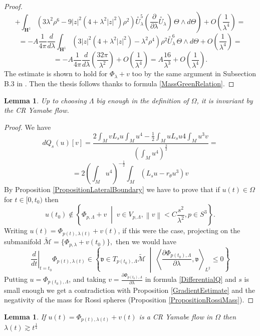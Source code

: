 \documentclass[a4paper,12pt]{amsart}
\newtheorem{lemma}[proposizione]{Lemma}
\newcommand{\de}{\partial}
\newcommand{\ci}[1]{\mathscr{#1}}%
\newcommand{\N}[1]{\left\lVert#1\right\rVert}
\newcommand{\bra}{\left\langle}
\newcommand{\ket}{\right\rangle}
\renewcommand{\H}{\mathbf{H}}
\newcommand{\g}[1]{\mathfrak{#1}}
\renewcommand{\l}{\lambda }
\begin{document}
\begin{proof}
 $$\left.+ \int_{\H^1}\left(3\lambda^2\rho^6 -9|z|^2 (4 + \lambda^2 |z|^2) \rho^2\right) \overset{\circ}{U}_\lambda^5\left(\frac{\de}{\de\lambda}\overset{\circ}{U}_{\lambda} \right) \, \Theta\wedge d\Theta\right) +O\left(\frac{1}{\lambda^4}\right)=$$
 $$=-A\frac{1}{4\pi}\frac{d}{d\lambda}\int_{\H^1} \left( 3 |z|^2 (4 + \l^2 |z|^2) - \l^2 \rho^4 \right) \rho^2 \overset{\circ}{U}_\l^6 \, \Theta\wedge d\Theta +O\left(\frac{1}{\lambda^4}\right)=$$
 $$=-A\frac{1}{4\pi}\frac{d}{d\lambda}\left(\frac{32\pi}{\lambda^2}\right) +O\left(\frac{1}{\lambda^4}\right) = A\frac{16}{\lambda^3} +O\left(\frac{1}{\lambda^4}\right).$$
 The estimate is shown to hold for $\Phi_{\lambda}+v$ too by the same argument in Subsection B.3 in \cite{CMY2}. Then the thesis follows thanks to formula \eqref{MassGreenRelation}.
\end{proof}

\begin{lemma}\label{LemmaInvariant}
 Up to choosing $\Lambda$ big enough in the definition of $\Omega$, it is invariant by the CR Yamabe flow.
\end{lemma}

\begin{proof}
We have
$$dQ_s(u)[v]= \frac{2\int_MvL_su\int_Mu^4-\frac{1}{2}\int_MuL_su4\int_Mu^3v}{\left(\int_Mu^4\right)^{\frac{3}{2}}}=$$
\begin{equation}\label{DifferentialQ}
 =2\left(\int_Mu^4\right)^{-\frac{1}{2}}\int_M\left(L_su-r_{\theta}u^3\right)v
\end{equation}
By Proposition \ref{PropositionLateralBoundary} we have to prove that if $u(t)\in\Omega$ for $t\in[0,t_0)$ then
$$u(t_0)\not\in\left\{\Phi_{p,\Lambda}+v\;\middle|\; v\in V_{p,\Lambda}, \N{v}< C\frac{s^2}{\lambda^2},p\in S^3 \right\}.$$
Writing $u(t)=\Phi_{p(t),\lambda(t)}+v(t)$, if this were the case, projecting on the submanifold $\widetilde{\ci{M}}=\{\Phi_{p,\lambda}+v(t_0)\},$ then we would have
$$\left.\frac{d}{dt}\right|_{t=t_0}\Phi_{p(t),\lambda(t)}\in \left\{\g{v}\in
T_{p(t_0),\Lambda}\widetilde{\ci{M}}
\;\middle|\;\bra\frac{\de\Phi_{p(t_0),\Lambda}}{\de\lambda},\g{v}\ket_{L^2}\le 0\right\}$$
Putting $u=\Phi_{p(t_0),\Lambda}$, and taking $v=\frac{\de\Phi_{p(t_0),\Lambda}}{\de\lambda}$ in formula \eqref{DifferentialQ} and $s$ is small enough we get a contradiction with Proposition \ref{GradientEstimate} and the negativity of the mass for Rossi spheres (Proposition \ref{PropositionRossiMass}).
\end{proof}

\begin{lemma}\label{LastLemma}
If $u(t)=\Phi_{p(t),\lambda(t)}+v(t)$ is a CR Yamabe flow in $\Omega$ then $\lambda(t)\gtrsim t^{\frac{1}{4}}$
\end{lemma}
\end{document}
